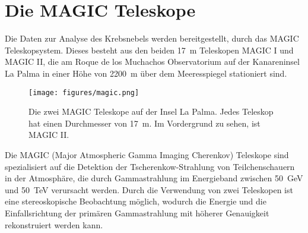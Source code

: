 \section{Die MAGIC Teleskope}
\label{sec:teleskop}

Die Daten zur Analyse des Krebsnebels werden bereitgestellt, durch das MAGIC
Teleskopsystem. Dieses besteht aus den beiden \SI{17}{\metre} Teleskopen MAGIC I
und MAGIC II, die am Roque de los Muchachos Observatorium auf der Kanareninsel
La Palma in einer Höhe von \SI{2200}{\metre} über dem Meeresspiegel stationiert
sind.

\begin{figure}
  \centering
  \texttt{[image: figures/magic.png]}
  \caption{Die zwei MAGIC Teleskope auf der Insel La Palma. Jedes Teleskop hat
  einen Durchmesser von \SI{17}{\metre}. Im Vordergrund zu sehen, ist MAGIC II.}
  \label{fig:telescope}
\end{figure}

Die MAGIC (Major Atmospheric Gamma Imaging Cherenkov) Teleskope sind
spezialisiert auf die Detektion der Tscherenkow-Strahlung von Teilchenschauern
in der Atmosphäre, die durch Gammastrahlung im Energieband zwischen
\SI{50}{\giga\electronvolt} und \SI{50}{\tera\electronvolt} verursacht werden.
Durch die Verwendung von zwei Teleskopen ist eine stereoskopische Beobachtung
möglich, wodurch die Energie und die Einfallsrichtung der primären
Gammastrahlung mit höherer Genauigkeit rekonstruiert werden kann.
